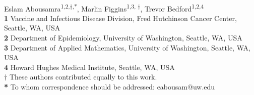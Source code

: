 \documentclass[10pt,letterpaper]{article}
\begin{document}
\vspace*{0.2in}

\begin{flushleft}
{\Large
\textbf{} %
}
\newline
\\
Eslam Abousamra\textsuperscript{1,2,$\dagger$,*},
Marlin Figgins\textsuperscript{1,3, $\dagger$},
Trevor Bedford\textsuperscript{1,2,4}
\\
\bigskip
\textbf{1} Vaccine and Infectious Disease Division, Fred Hutchinson Cancer Center, Seattle, WA, USA
\\
\textbf{2} Department of Epidemiology, University of Washington, Seattle, WA, USA
\\
\textbf{3} Department of Applied Mathematics, University of Washington, Seattle, WA, USA
\\
\textbf{4} Howard Hughes Medical Institute, Seattle, WA, USA
\\
\textbf{$\dagger$} These authors contributed equally to this work.
\\
\textbf{*} To whom correspondence should be addressed: eabousam@uw.edu

\bigskip

%
%






\end{flushleft}
\end{document}
